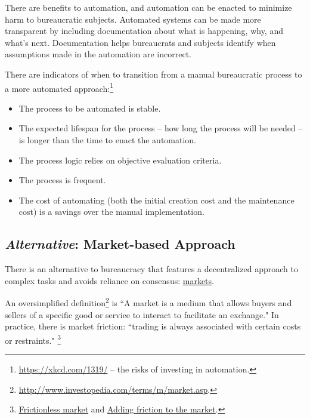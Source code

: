 There are benefits to automation, and automation can be enacted to minimize harm to bureaucratic subjects.  Automated systems can be made more transparent by including documentation about what is happening, why, and what's next.
Documentation helps  bureaucrats and subjects identify when assumptions made in the automation are incorrect. 


There are indicators of when to transition from a manual bureaucratic process to a more automated approach:\footnote{\href{https://xkcd.com/1319/}{https://xkcd.com/1319/} -- the risks of investing in automation.}
\begin{itemize}
    \item The process to be automated is stable.
    \item The expected lifespan for the process -- how long the process will be needed -- is  longer than the time to enact the automation.
\item The process logic relies on objective evaluation criteria.  
\item The process is frequent.
\item The cost of automating (both the initial creation cost and the maintenance cost) is a savings over the manual implementation.
\end{itemize}


\subsection*{\textit{Alternative}: Market-based Approach}

There is an alternative to bureaucracy that features a decentralized approach to complex tasks and avoids reliance on consensus: \href{https://en.wikipedia.org/wiki/Market_(economics)}{markets}.

An oversimplified definition\footnote{\href{http://www.investopedia.com/terms/m/market.asp}{http://www.investopedia.com/terms/m/market.asp}.} is ``A market is a medium that allows buyers and sellers of a specific good or service to interact to facilitate an exchange." 
In practice, there is market friction: ``trading is always associated with certain costs or restraints."
\footnote{\href{http://www.investopedia.com/terms/f/frictionlessmarket.asp}{Frictionless market}\iftoggle{printedonpaper}{ (see http://www.investopedia.com/terms)}{}
and \href{https://insight.kellogg.northwestern.edu/article/adding_friction_to_the_market}{Adding friction to the market}\iftoggle{printedonpaper}{ (see https://insight.kellogg.northwestern.edu)}{}.}

